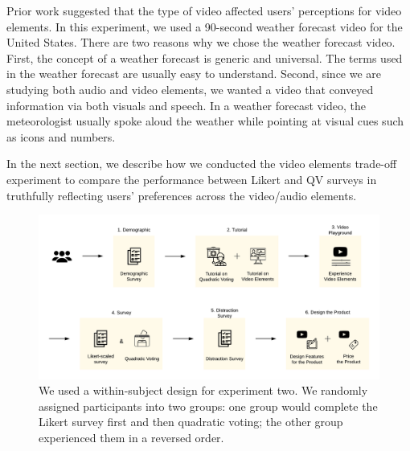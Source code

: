 Prior work suggested that the type of video affected users' perceptions for video elements. In this experiment, we used a 90-second weather forecast video for the United States. There are two reasons why we chose the weather forecast video. First, the concept of a weather forecast is generic and universal. The terms used in the weather forecast are usually easy to understand. Second, since we are studying both audio and video elements, we wanted a video that conveyed information via both visuals and speech. In a weather forecast video, the meteorologist usually spoke aloud the weather while pointing at visual cues such as icons and numbers.

In the next section, we describe how we conducted the video elements trade-off experiment to compare the performance between Likert and QV surveys in truthfully reflecting users' preferences across the video/audio elements.

\begin{figure}[htpb]
    \centering
    \includegraphics[width=\textwidth, keepaspectratio=true]{content/image/exp2_procedure.pdf}
    \caption{
        We used a within-subject design for experiment two. We randomly assigned participants into two groups: one group would complete the Likert survey first and then quadratic voting; the other group experienced them in a reversed order.
    }
    \label{fig:exp2_flow}
\end{figure}

